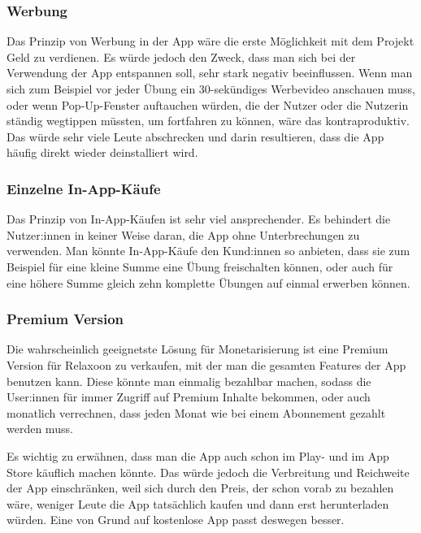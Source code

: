 \subsubsection{Werbung}

Das Prinzip von Werbung in der App wäre die erste Möglichkeit mit dem Projekt Geld zu verdienen. 
Es würde jedoch den Zweck, dass man sich bei der Verwendung der App entspannen soll, sehr stark negativ beeinflussen.
Wenn man sich zum Beispiel vor jeder Übung ein 30-sekündiges Werbevideo anschauen muss, oder wenn Pop-Up-Fenster 
auftauchen würden, die der Nutzer oder die Nutzerin ständig wegtippen müssten, um fortfahren zu können, wäre das
kontraproduktiv. Das würde
sehr viele Leute abschrecken und darin resultieren, dass die App häufig direkt wieder deinstalliert wird.

\subsubsection{Einzelne In-App-Käufe}

Das Prinzip von In-App-Käufen ist sehr viel ansprechender. Es behindert die Nutzer:innen in keiner Weise daran,
die App ohne Unterbrechungen zu verwenden. Man könnte In-App-Käufe den Kund:innen so anbieten, dass sie zum
Beispiel für eine kleine Summe eine Übung freischalten können, oder auch für eine höhere Summe gleich zehn komplette
Übungen auf einmal erwerben können. 

\subsubsection{Premium Version}

Die wahrscheinlich geeignetste Lösung für Monetarisierung ist eine Premium Version für Relaxoon zu verkaufen, mit
der man die gesamten Features der App benutzen kann. Diese könnte man einmalig bezahlbar machen, sodass die User:innen
für immer Zugriff auf Premium Inhalte bekommen, oder auch 
monatlich verrechnen, dass jeden Monat wie bei einem Abonnement gezahlt werden muss.

\newpage

Es wichtig zu erwähnen, dass man die App auch schon im Play- und im App Store käuflich machen könnte. Das würde
jedoch die Verbreitung und Reichweite der App einschränken, weil sich durch den Preis, der schon vorab zu bezahlen
wäre, weniger Leute die App tatsächlich kaufen und dann erst herunterladen würden. Eine von Grund auf kostenlose
App passt deswegen besser.

